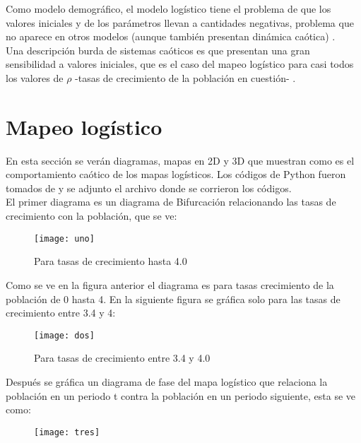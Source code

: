 \documentclass[12pt,letterpaper]{article}
\begin{document}
Como modelo demográfico, el modelo logístico tiene el problema de que los valores iniciales y de los parámetros llevan a cantidades negativas, problema que no aparece en otros modelos (aunque también presentan dinámica caótica) \cite{a}.\\
Una descripción burda de sistemas caóticos es que presentan una gran sensibilidad a valores iniciales, que es el caso del mapeo logístico para casi todos los valores de $\rho$ -tasas de crecimiento de la población en cuestión- \cite{a}.



\section{Mapeo logístico}

En esta sección se verán diagramas, mapas en 2D y 3D que muestran como es el comportamiento caótico de los mapas logísticos. Los códigos de Python fueron tomados de \cite{b} y se adjunto el archivo donde se corrieron los códigos. \\
El primer diagrama es un diagrama de Bifurcación relacionando las tasas de crecimiento con la población, que se ve:

\begin{figure}[H]
	\centering
	\texttt{[image: uno]}
	\caption{Para tasas de crecimiento hasta 4.0}
\end{figure}

Como se ve en la figura anterior el diagrama es para tasas crecimiento de la población de 0 hasta 4. En la siguiente figura se gráfica solo para las tasas de crecimiento entre 3.4 y 4:

\begin{figure}[H]
	\centering
	\texttt{[image: dos]}
	\caption{Para tasas de crecimiento entre 3.4 y 4.0}
\end{figure}

Después se gráfica un diagrama de fase del mapa logístico que relaciona la población en un periodo t contra la población en un periodo siguiente, esta se ve como:

\begin{figure}[H]
	\centering
	\texttt{[image: tres]}
	\caption{}
\end{figure}
\end{document}
